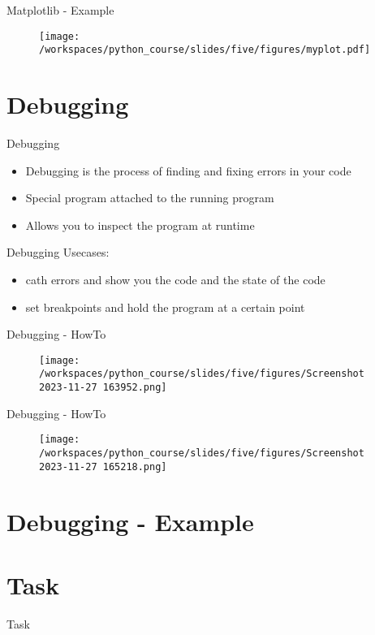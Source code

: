 \documentclass{beamer}
\begin{document}
\begin{frame}{Matplotlib - Example}
    \begin{figure}
        \centering
        \texttt{[image: /workspaces/python\_course/slides/five/figures/myplot.pdf]}
    \end{figure}
\end{frame}

\section{Debugging}

\begin{frame}{Debugging}
    \begin{itemize}
        \item  <1-> Debugging is the process of finding and fixing errors in your code
        \item  <2-> Special program attached to the running program
        \item <3-> Allows you to inspect the program at runtime
    \end{itemize}
\end{frame}

\begin{frame}{Debugging}
    Usecases:
    \begin{itemize}
        \item cath errors and show you the code and the state of the code
        \item set breakpoints and hold the program at a certain point
    \end{itemize}
\end{frame}

\begin{frame}{Debugging - HowTo}
    \begin{figure}
        \centering
        \texttt{[image: /workspaces/python\_course/slides/five/figures/Screenshot 2023-11-27 163952.png]}
    \end{figure}
\end{frame}

\begin{frame}{Debugging - HowTo}
    \begin{figure}
        \centering
        \texttt{[image: /workspaces/python\_course/slides/five/figures/Screenshot 2023-11-27 165218.png]}
    \end{figure}
\end{frame}


\section{Debugging - Example}

\section{Task}

\begin{frame}{Task}
    
\end{frame}
\end{document}

